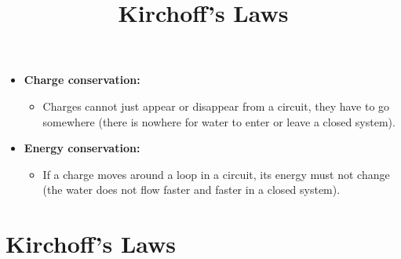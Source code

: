 \documentclass[aspectratio=169,
hyperref={colorlinks,urlcolor=blue}
]{beamer}
\begin{document}
{
\begin{itemize}
\item \textbf{Charge conservation:}
\begin{itemize}
\item Charges cannot just appear or disappear from a circuit, they have to go somewhere (there is nowhere for water to enter or leave a closed system).
\end{itemize}
\item \textbf{Energy conservation:}
\begin{itemize}
\item If a charge moves around a loop in a circuit, its energy must not change (the water does not flow faster and faster in a closed system).
\end{itemize}
\end{itemize}
}
{
}





\section{Kirchoff's Laws}
\label{sec:kirchoffslaws}
\title{Kirchoff's Laws}


\begin{frame}
\titlepage
\thispagestyle{empty}
\end{frame}




\end{document}
